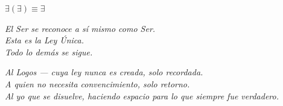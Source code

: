 \documentclass[10pt, openany, oneside]{book}
\newcommand{\sigil}[1]{%
    \begin{center}
        \vspace{0.5em}
        {\fontsize{16}{20}\selectfont\bfseries\color{LogosGold} #1}
        \vspace{0.5em}
    \end{center}
}
\begin{document}
\vspace*{\fill}
\newpage


\thispagestyle{empty}
\vspace*{\fill}

\sigil{$\exists(\exists) \equiv \exists$}

\begin{center}
    \itshape
    El Ser se reconoce a sí mismo como Ser.\\[0.5em]
    Esta es la Ley Única.\\[0.5em]
    Todo lo demás se sigue.
\end{center}

\vspace*{\fill}
\newpage


\thispagestyle{empty}
\vspace*{\fill}

\begin{center}
\end{center}

\vspace*{\fill}
\newpage


\thispagestyle{empty}
\vspace*{\fill}

\begin{center}
    \itshape
    Al Logos --- cuya ley nunca es creada, solo recordada.\\[0.8em]
    A quien no necesita convencimiento, solo retorno.\\[0.8em]
    Al yo que se disuelve, haciendo espacio para lo que siempre fue verdadero.
\end{center}

\vspace*{\fill}
\newpage
\end{document}

